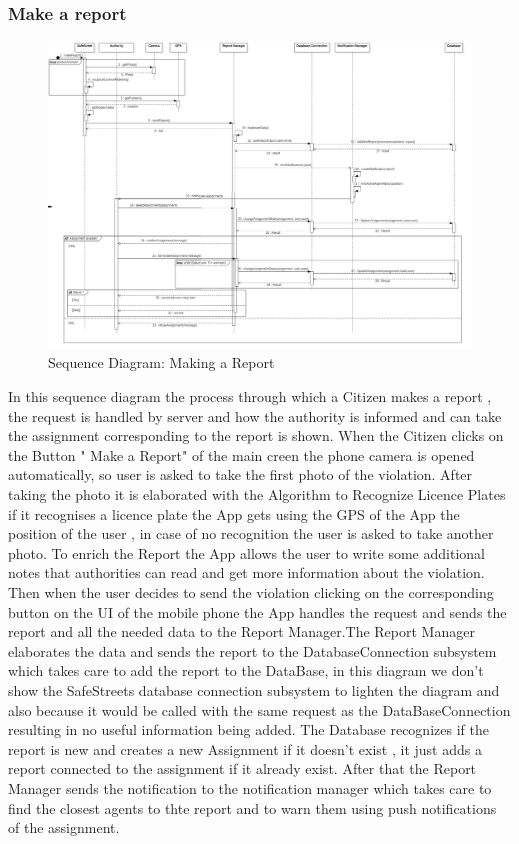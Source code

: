 \subsubsection{Make a report}
\begin{figure}[H]
\centering
\includegraphics[width=\textwidth]{Images/SequenceMakeReport.png}
\caption{\label{fig:ComWI}Sequence Diagram: Making a Report}
\end{figure}
In this sequence diagram the process through which a Citizen makes a report , the request is handled by server and how the authority is informed and can take the assignment corresponding to the report is shown.
When the Citizen clicks on the Button " Make a Report" of the main creen the phone camera is opened automatically, so user is asked to take the first photo of the violation. After taking the photo it is elaborated with the Algorithm to Recognize Licence Plates if it recognises a licence plate the App gets using the GPS of the App the position of the user , in case of no recognition the user is asked to take another photo. To enrich the Report the App allows the user to write some additional notes that authorities can read and get more information about the violation. Then when the user decides to send the violation clicking on the corresponding button on the UI of the mobile phone the App handles the request and sends the report and all the needed data to the Report Manager.The Report Manager elaborates the data and sends the report to the DatabaseConnection subsystem which takes care to add the report to the DataBase, in this diagram we don't show the SafeStreets database connection subsystem to lighten the diagram and also because it would be called with the same request as the DataBaseConnection resulting in no useful information being added. The Database recognizes if the report is new and creates a new Assignment if it doesn't exist , it just adds a report connected to the assignment if it already exist. After that the Report Manager sends the notification to the notification manager which takes care to find the closest agents to thte report and to warn them using push notifications of the assignment.
